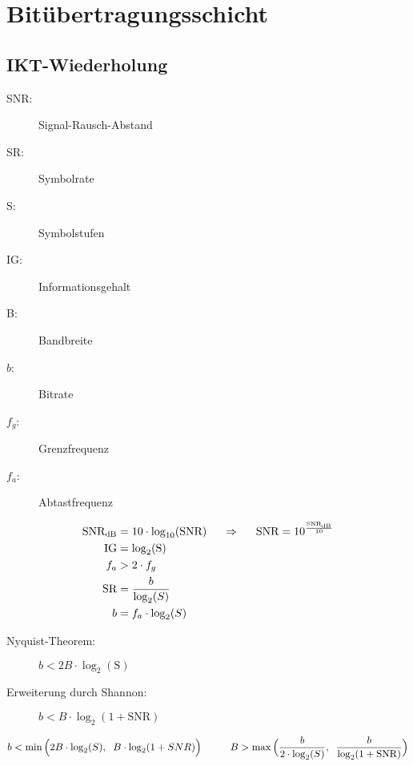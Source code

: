 \documentclass[a4paper]{article}
\newcommand{\hs}[1]{\hspace{#1}}
\begin{document}
\section{Bitübertragungsschicht}
\subsection{IKT-Wiederholung}
\begin{minipage}[t]{0.5\textwidth}
    \begin{description}
        \item[SNR:] Signal-Rausch-Abstand
        \item[SR:] Symbolrate
        \item[S:] Symbolstufen
        \item[IG:] Informationsgehalt
    \end{description}
\end{minipage}
\begin{minipage}[t]{0.5\textwidth}
    \begin{description}
        \item[B:] Bandbreite
        \item[$b$:] Bitrate
        \item[$f_g$:] Grenzfrequenz
        \item[$f_a$:] Abtastfrequenz
    \end{description}
\end{minipage}

\begin{align*}
    \text{SNR}_{\text{dB}} &= 10 \cdot \log_{10}(\text{SNR}) \hspace{5mm} \Rightarrow \hspace{5mm} \text{SNR} = 10^{\frac{\text{SNR}_{\text{dB}}}{10}}\\
    \text{IG} &= \log_2(\text{S})\\
    f_a &> 2 \cdot f_g \\
    \text{SR} &= \frac{b}{\log_2(S)}\\
    b &= f_a \cdot \log_2(S)
\end{align*}
\begin{description}
    \item[Nyquist-Theorem:] $b < 2B \cdot \log_2(\text{S})$
    \item[Erweiterung durch Shannon:] $b < B \cdot \log_2(1 + \text{SNR})$
\end{description}
%
\[
    b < \min \Big( 2B \cdot \log_2(S), \hs{2mm} B \cdot \log_2(1 + SNR) \Big) \hs{1cm}
    B > \max \Big( \frac{b}{2 \cdot \log_2(S)}, \hs{2mm} \frac{b}{\log_2(1+\text{SNR})} \Big)
\]
\end{document}
